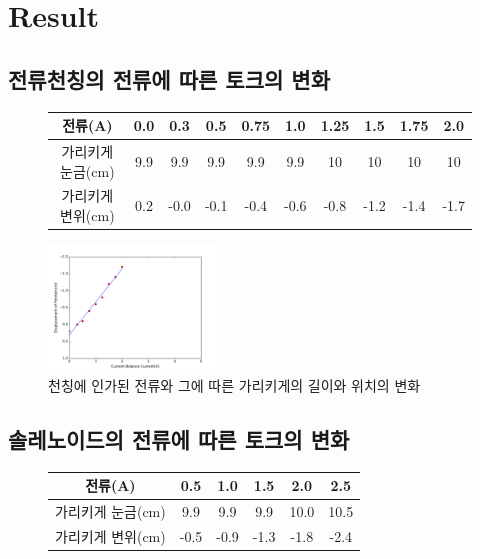\documentclass[a4paper]{article}
\begin{document}
	\newpage

	\section{Result}

		\subsection{전류천칭의 전류에 따른 토크의 변화}
		\begin{figure}[h]
			\centering
			\begin{tabular}{cccccccccc} 
				\hline \hline
				전류(\si{A})   \qquad \qquad \vline & 0.0 & 0.3 & 0.5 & 0.75 & 1.0 & 1.25 & 1.5 & 1.75 & 2.0 \\
				\hline
				가리키게 눈금(\si{cm}) \vline & 9.9 & 9.9 & 9.9 & 9.9 & 9.9 & 10 & 10 & 10 & 10 \\
				\hline
				가리키게 변위(\si{cm}) \vline & 0.2 & -0.0 & -0.1 & -0.4 & -0.6 & -0.8 & -1.2 & -1.4 & -1.7 \\
				\hline \hline
			\end{tabular}  
			\label{tb:cirouput}
		\end{figure}

		\vspace{-0.7cm}
		
		\begin{figure}[h]
			\centering
			\includegraphics[width=0.4\textwidth]{img/figure_1.png}
			\vspace{-0.5cm}
			\caption{천칭에 인가된 전류와 그에 따른 가리키게의 길이와 위치의 변화}
		\end{figure}

		\vspace{-1cm}

		\subsection{솔레노이드의 전류에 따른 토크의 변화}
		\begin{figure}[h]
			\centering
				\begin{tabular}{cccccc} 
					\hline \hline
					전류(A) \qquad \qquad \vline & 0.5 & 1.0 & 1.5 & 2.0 & 2.5 \\
					\hline
					가리키게 눈금(\si{cm}) \vline & 9.9 & 9.9 & 9.9 & 10.0 & 10.5 \\
					\hline
					가리키게 변위(\si{cm}) \vline & -0.5 & -0.9 & -1.3 & -1.8 & -2.4 \\
					\hline \hline
				\end{tabular}  
			\label{tb:soloutput}
		\end{figure}
		
\end{document}
